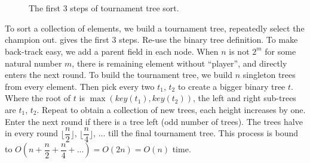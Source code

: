 \documentclass[b5paper]{article}
\begin{document}
\captionsetup[subfigure]{labelformat=empty, margin=10pt}
\begin{figure}[htbp]
  \centering
   \\
   \\
  \caption{The first 3 steps of tournament tree sort.}
  \label{fig:tournament-tree-4}
\end{figure}
\captionsetup[subfigure]{labelformat=parens}

To sort a collection of elements, we build a tournament tree, repeatedly select the champion out.  gives the first 3 steps. Re-use the binary tree definition. To make back-track easy, we add a parent field in each node. When $n$ is not $2^m$ for some natural number $m$, there is remaining element without ``player'', and directly enters the next round. To build the tournament tree, we build $n$ singleton trees from every element. Then pick every two $t_1$, $t_2$ to create a bigger binary tree $t$. Where the root of $t$ is $\max(key(t_1), key(t_2))$, the left and right sub-trees are $t_1$, $t_2$. Repeat to obtain a collection of new trees, each height increases by one. Enter the next round if there is a tree left (odd number of trees). The trees halve in every round $\lfloor \dfrac{n}{2} \rfloor$, $\lfloor \dfrac{n}{4} \rfloor$, ... till the final tournament tree. This process is bound to $O(n + \dfrac{n}{2} + \dfrac{n}{4} + ... ) = O(2n) = O(n)$ time.
\end{document}
